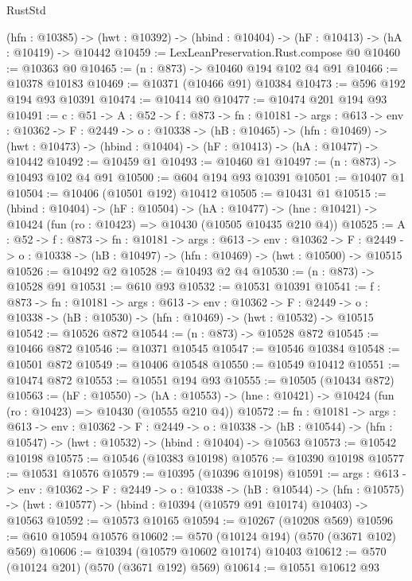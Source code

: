 \begin{lexlean}{RustStd}
\begin{coremodule}
  (hfn : @10385) -> (hwt : @10392) -> (hbind : @10404) -> (hF : @10413) -> (hA : @10419) -> @10442
@10459 := LexLeanPreservation.Rust.compose @0
@10460 := @10363 @0
@10465 := (n : @873) -> @10460 @194 @102 @4 @91
@10466 := @10378 @10183
@10469 := @10371 (@10466 @91) @10384
@10473 := @596 @192 @194 @93 @10391
@10474 := @10414 @0
@10477 := @10474 @201 @194 @93
@10491 := {c : @51} ->
  {A : @52} ->
  {f : @873} ->
  {fn : @10181} ->
  {args : @613} ->
  {env : @10362} ->
  {F : @2449} ->
  {o : @10338} ->
  (hB : @10465) ->
  (hfn : @10469) -> (hwt : @10473) -> (hbind : @10404) -> (hF : @10413) -> (hA : @10477) -> @10442
@10492 := @10459 @1
@10493 := @10460 @1
@10497 := (n : @873) -> @10493 @102 @4 @91
@10500 := @604 @194 @93 @10391
@10501 := @10407 @1
@10504 := @10406 (@10501 @192) @10412
@10505 := @10431 @1
@10515 := (hbind : @10404) ->
  (hF : @10504) ->
  (hA : @10477) -> (hne : @10421) -> @10424 (fun (ro : @10423) => @10430 (@10505 @10435 @210 @4))
@10525 := {A : @52} ->
  {f : @873} ->
  {fn : @10181} ->
  {args : @613} ->
  {env : @10362} ->
  {F : @2449} -> {o : @10338} -> (hB : @10497) -> (hfn : @10469) -> (hwt : @10500) -> @10515
@10526 := @10492 @2
@10528 := @10493 @2 @4
@10530 := (n : @873) -> @10528 @91
@10531 := @610 @93
@10532 := @10531 @10391
@10541 := {f : @873} ->
  {fn : @10181} ->
  {args : @613} ->
  {env : @10362} ->
  {F : @2449} -> {o : @10338} -> (hB : @10530) -> (hfn : @10469) -> (hwt : @10532) -> @10515
@10542 := @10526 @872
@10544 := (n : @873) -> @10528 @872
@10545 := @10466 @872
@10546 := @10371 @10545
@10547 := @10546 @10384
@10548 := @10501 @872
@10549 := @10406 @10548
@10550 := @10549 @10412
@10551 := @10474 @872
@10553 := @10551 @194 @93
@10555 := @10505 (@10434 @872)
@10563 := (hF : @10550) ->
  (hA : @10553) -> (hne : @10421) -> @10424 (fun (ro : @10423) => @10430 (@10555 @210 @4))
@10572 := {fn : @10181} ->
  {args : @613} ->
  {env : @10362} ->
  {F : @2449} ->
  {o : @10338} -> (hB : @10544) -> (hfn : @10547) -> (hwt : @10532) -> (hbind : @10404) -> @10563
@10573 := @10542 @10198
@10575 := @10546 (@10383 @10198)
@10576 := @10390 @10198
@10577 := @10531 @10576
@10579 := @10395 (@10396 @10198)
@10591 := {args : @613} ->
  {env : @10362} ->
  {F : @2449} ->
  {o : @10338} ->
  (hB : @10544) ->
  (hfn : @10575) -> (hwt : @10577) -> (hbind : @10394 (@10579 @91 @10174) @10403) -> @10563
@10592 := @10573 @10165
@10594 := @10267 (@10208 @569)
@10596 := @610 @10594 @10576
@10602 := @570 (@10124 @194) (@570 (@3671 @102) @569)
@10606 := @10394 (@10579 @10602 @10174) @10403
@10612 := @570 (@10124 @201) (@570 (@3671 @192) @569)
@10614 := @10551 @10612 @93

\end{coremodule}
\end{lexlean}
